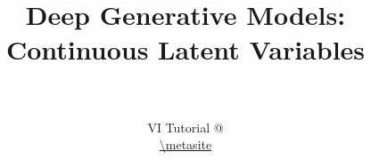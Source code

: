 \documentclass[14pt]{beamer}
\title[VAEs]{Deep Generative Models: \\
Continuous Latent Variables}
\date{}
\author[VI Tutorial @ \metahost]{ \metaauthor \\ 
~\\
VI Tutorial @ \metahost \\
\url{\metasite}
}
\begin{document}
\frame{\titlepage}

\frame{\tableofcontents}


\end{document}
